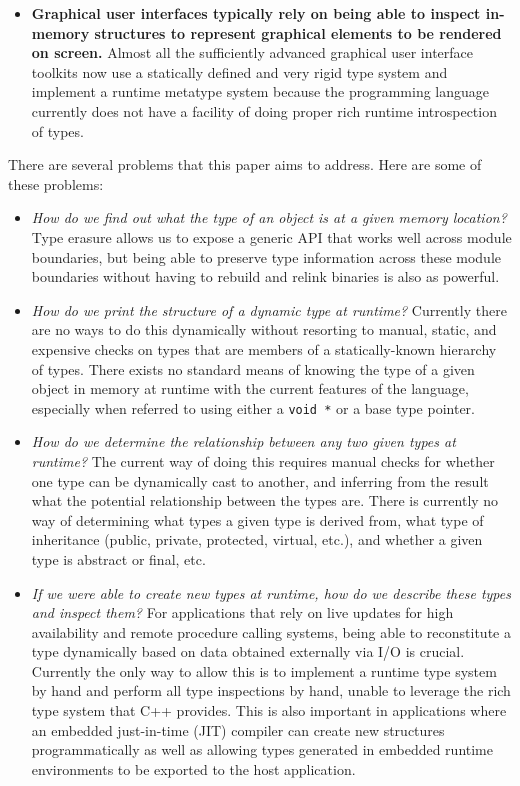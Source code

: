 \begin{itemize}
  \item \textbf{Graphical user interfaces typically rely on being able to
  inspect in­-memory structures to represent graphical elements to be rendered
  on screen.} Almost all the sufficiently advanced graphical user interface
  toolkits now use a statically­ defined and very rigid type system and
  implement a runtime meta­type system because the programming language
  currently does not have a facility of doing proper rich runtime
  introspection of types. \end{itemize}

There are several problems that this paper aims to address. Here are some of
these problems:

\begin{itemize}

  \item \emph{How do we find out what the type of an object is at a given
  memory location?} Type erasure allows us to expose a generic API that works
  well across module boundaries, but being able to preserve type information
  across these module boundaries without having to rebuild and relink binaries
  is also as powerful.

  \item \emph{How do we print the structure of a dynamic type at runtime?}
  Currently there are no ways to do this dynamically without resorting to
  manual, static, and expensive checks on types that are members of a
  statically-known hierarchy of types. There exists no standard means of
  knowing the type of a given object in memory at runtime with the current
  features of the language, especially when referred to using either a
  \verb+void *+ or a base type pointer.

  \item \emph{How do we determine the relationship between any two given types
  at runtime?} The current way of doing this requires manual checks for
  whether one type can be dynamically cast to another, and inferring from the
  result what the potential relationship between the types are. There is
  currently no way of determining what types a given type is derived from,
  what type of inheritance (public, private, protected, virtual, etc.), and
  whether a given type is abstract or final, etc.

  \item \emph{If we were able to create new types at runtime, how do we
  describe these types and inspect them?} For applications that rely on live
  updates for high availability and remote procedure calling systems, being
  able to reconstitute a type dynamically based on data obtained externally
  via I/O is crucial. Currently the only way to allow this is to implement a
  runtime type system by hand and perform all type inspections by hand, unable
  to leverage the rich type system that C++ provides. This is also important
  in applications where an embedded just-in-time (JIT) compiler can create new
  structures programmatically as well as allowing types generated in embedded
  runtime environments to be exported to the host application.

\end{itemize}

